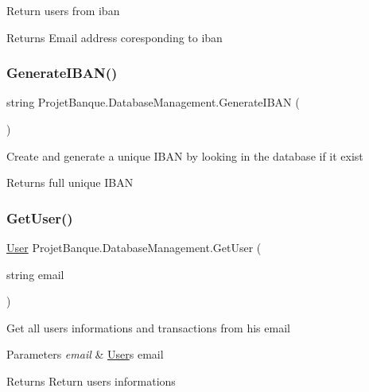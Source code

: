 Return user\textquotesingle{}s from iban 

\begin{DoxyReturn}{Returns}
Email address coresponding to iban
\end{DoxyReturn}
\mbox{\label{class_projet_banque_1_1_database_management_a9564153cbc9e0d832508cc2a6d51932c}} 
\subsubsection{\texorpdfstring{GenerateIBAN()}{GenerateIBAN()}}
{\footnotesize\ttfamily string Projet\+Banque.\+Database\+Management.\+Generate\+I\+B\+AN (\begin{DoxyParamCaption}{ }\end{DoxyParamCaption})}



Create and generate a unique I\+B\+AN by looking in the database if it exist 

\begin{DoxyReturn}{Returns}
full unique I\+B\+AN
\end{DoxyReturn}
\mbox{\label{class_projet_banque_1_1_database_management_aa9be95f45987bd7f55d1553e43e1c546}} 
\subsubsection{\texorpdfstring{GetUser()}{GetUser()}}
{\footnotesize\ttfamily \mbox{\hyperlink{class_projet_banque_1_1_user}{User}} Projet\+Banque.\+Database\+Management.\+Get\+User (\begin{DoxyParamCaption}\item[{string}]{email }\end{DoxyParamCaption})}



Get all user\textquotesingle{}s informations and transactions from his email 


\begin{DoxyParams}{Parameters}
{\em email} & \mbox{\hyperlink{class_projet_banque_1_1_user}{User}}\textquotesingle{}s email\\
\hline
\end{DoxyParams}
\begin{DoxyReturn}{Returns}
Return user\textquotesingle{}s informations
\end{DoxyReturn}
\mbox{\label{class_projet_banque_1_1_database_management_ae0af13394741c4671c86ffb098e281e7}} 
